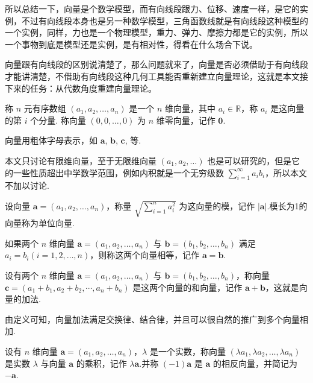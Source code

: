 所以总结一下，向量是个数学模型，而有向线段跟力、位移、速度一样，是它的实例，不过有向线段本身也是另一种数学模型，三角函数线就是有向线段这种模型的一个实例，同样，力也是一个物理模型，重力、弹力、摩擦力都是它的实例，所以一个事物到底是模型还是实例，是有相对性，得看在什么场合下说。

向量跟有向线段的区别说清楚了，那么问题就来了，向量是否必须借助于有向线段才能讲清楚，不借助有向线段这种几何工具能否重新建立向量理论，这就是本文接下来的任务：从代数角度重建向量理论。

\begin{definition}
  称 $n$ 元有序数组 $(a_1, a_2, \ldots, a_n)$ 是一个 $n$
  维向量，其中 $a_i \in \mathbb{R}$，称 $a_i$ 是这向量的第 $i$
  个分量. 称向量 $(0, 0, \ldots, 0)$ 为 $n$ 维零向量，记作
  $\bm{0}$.
\end{definition}

向量用粗体字母表示，如 $\bm{a}$, $\bm{b}$,
$\bm{c}$, 等.

本文只讨论有限维向量，至于无限维向量 $(a_1, a_2, \ldots)$
也是可以研究的，但是它的一些性质超出中学数学范围，例如内积就是一个无穷级数
$\sum_{i = 1}^{\infty} a_i b_i$，所以本文不加以讨论.

\begin{definition}
  设向量 $\bm{a}= (a_1, a_2, \ldots, a_n)$，称量 $\sqrt{\sum_{i =
  1}^n a_i^2}$ 为这向量的模，记作 $| \bm{a}
  |$.模长为1的向量称为单位向量.
\end{definition}

\begin{definition}
  如果两个 $n$ 维向量 $\bm{a}= (a_1, a_2 , \ldots, a_n)$
  与 $\bm{b}= (b_1, b_2, \ldots, b_n)$ 满足 $a_i = b_i (i = 1, 2,
  \ldots, n)$，则称这两个向量相等，记作
  $\bm{a}=\bm{b}$.
\end{definition}

\begin{definition}
  设有两个 $n$ 维向量 $\bm{a}= (a_1, a_2 , \ldots, a_n)$
  与 $\bm{b}= (b_1, b_2, \ldots, b_n)$，称向量 $\bm{c}= (a_1
  + b_1, a_2 + b_2, \cdots, a_n + b_n)$
  是这两个向量的和向量，记作
  $\bm{a}+\bm{b}$，这就是向量的加法.
\end{definition}

由定义可知，向量加法满足交换律、结合律，并且可以很自然的推广到多个向量相加.

\begin{definition}
  设有 $n$ 维向量 $\bm{a}= (a_1, a_2 , \ldots,
  a_n)$，$\lambda$ 是一个实数，称向量 $(\lambda a_1, \lambda a_2,
  \ldots, \lambda a_n)$ 是实数 $\lambda$ 与向量 $\bm{a}$
  的乘积，记作 $\lambda \bm{a}$.并称 $(- 1) \bm{a}$ 是
  $\bm{a}$ 的相反向量，并简记为 $-\bm{a}$.
\end{definition}

